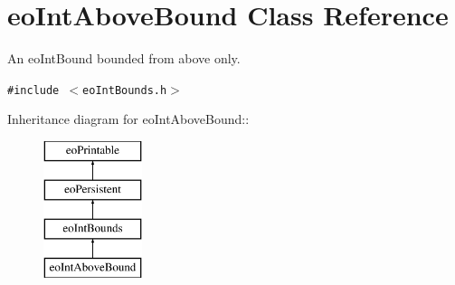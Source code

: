 \section{eo\-Int\-Above\-Bound Class Reference}
\label{classeo_int_above_bound}
An eo\-Int\-Bound bounded from above only.  


{\tt \#include $<$eo\-Int\-Bounds.h$>$}

Inheritance diagram for eo\-Int\-Above\-Bound::\begin{figure}[H]
\begin{center}
\leavevmode
\includegraphics[height=4cm]{classeo_int_above_bound}
\end{center}
\end{figure}
